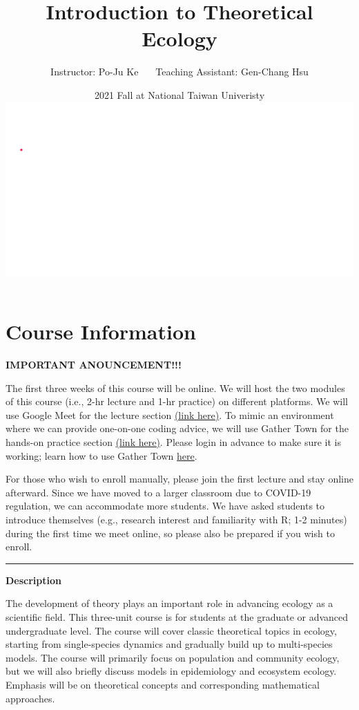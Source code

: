 \documentclass[
]{book}
\title{Introduction to Theoretical Ecology}
\author{Instructor: Po-Ju Ke \(~~~~~\) Teaching Assistant: Gen-Chang Hsu}
\date{2021 Fall at National Taiwan Univeristy \includegraphics{./bifurcation.gif}}
\begin{document}
\maketitle

{
\setcounter{tocdepth}{1}
\tableofcontents
}
\hypertarget{course-information}{%
\chapter*{Course Information}\label{course-information}}

\textbf{IMPORTANT ANOUNCEMENT!!!}

The first three weeks of this course will be online. We will host the two modules of this course (i.e., 2-hr lecture and 1-hr practice) on different platforms. We will use Google Meet for the lecture section \href{https://meet.google.com/nzd-cdjp-kbt}{(link here)}. To mimic an environment where we can provide one-on-one coding advice, we will use Gather Town for the hands-on practice section \href{https://gather.town/app/osrqFSf0a7q0I6uo/TheoreticalEcology}{(link here)}. Please login in advance to make sure it is working; learn how to use Gather Town \href{https://www.youtube.com/watch?v=89at5EvCEvk}{here}.

For those who wish to enroll manually, please join the first lecture and stay online afterward. Since we have moved to a larger classroom due to COVID-19 regulation, we can accommodate more students. We have asked students to introduce themselves (e.g., research interest and familiarity with R; 1-2 minutes) during the first time we meet online, so please also be prepared if you wish to enroll.

\begin{center}\rule{0.5\linewidth}{0.5pt}\end{center}

\textbf{Description}

The development of theory plays an important role in advancing ecology as a scientific field. This three-unit course is for students at the graduate or advanced undergraduate level. The course will cover classic theoretical topics in ecology, starting from single-species dynamics and gradually build up to multi-species models. The course will primarily focus on population and community ecology, but we will also briefly discuss models in epidemiology and ecosystem ecology. Emphasis will be on theoretical concepts and corresponding mathematical approaches.
\end{document}
